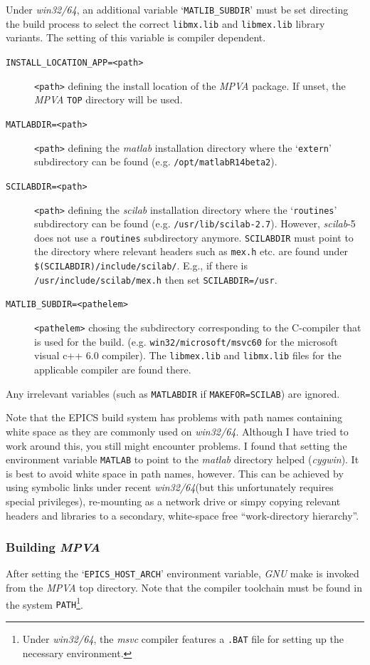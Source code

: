 \documentclass{article}
\newcommand{\sca}{\ita{MPVA}}
\newcommand{\scilab}{\ita{scilab}}
\newcommand{\matlab}{\ita{matlab}}
\newcommand{\windoze}{\ita{win32/64}}
\newcommand{\com}[1]{{\tt #1}}
\newcommand{\ita}[1]{\emph{#1}}
\begin{document}
\begin{description}
Under \windoze{}, an additional variable
`\com{MATLIB\_SUBDIR}' must be set directing the build process to select the correct
\com{libmx.lib} and \com{libmex.lib} library variants. The setting of this variable
is compiler dependent.
\begin{description}
\item[\tt INSTALL\_LOCATION\_APP=<path>] \com{<path>} defining the
install location of the \sca{} package. If unset, the \sca{} \com{TOP}
directory will be used.
\item[\tt MATLABDIR=<path>] \com{<path>} defining the \matlab{} installation
directory where the `\com{extern}' subdirectory can be found (e.g.
\com{/opt/matlabR14beta2}).
\item[\tt SCILABDIR=<path>] \com{<path>} defining the \scilab{} installation
directory where the `\com{routines}' subdirectory can be found (e.g.
\com{/usr/lib/scilab-2.7}). However, \scilab{}-5 does not use a \com{routines}
subdirectory anymore. {\tt SCILABDIR} must point to the directory where
relevant headers such as {\tt mex.h} etc. are found under
{\tt \$(SCILABDIR)/include/scilab/}. E.g., if there is {\tt /usr/include/scilab/mex.h} then set {\tt SCILABDIR=/usr}.
\item[\tt MATLIB\_SUBDIR=<pathelem>] \com{<pathelem>} chosing the subdirectory
corresponding to the C-compiler that is used for the build. (e.g. 
\com{win32/microsoft/msvc60} for the microsoft visual c++ 6.0 compiler).
The \com{libmex.lib} and \com{libmx.lib} files for the applicable compiler
are found there.
\end{description}
\end{description}
Any irrelevant variables (such as \com{MATLABDIR} if \com{MAKEFOR=SCILAB})
are ignored.

Note that the EPICS build system has problems with path names containing
white space as they are commonly used on \windoze. Although I have
tried to work around this, you still might encounter problems. I found
that setting the environment variable \com{MATLAB} to point to the \matlab{}
directory helped (\ita{cygwin}). It is best to avoid white space in path
names, however. This can be achieved by using symbolic links under recent
\windoze (but this unfortunately requires special privileges), re-mounting
as a network drive or simpy copying relevant headers and libraries
to a secondary, white-space free ``work-directory hierarchy''.

\subsubsection{Building \sca}
After setting the
`\com{EPICS\_HOST\_ARCH}' environment variable, \ita{GNU} make is invoked from the \sca{} top 
directory. Note that the compiler toolchain must be found in the system
\com{PATH}\footnote{
Under \windoze, the \ita{msvc} compiler features a \com{.BAT} file for
setting up the necessary environment.
}.
\end{document}

